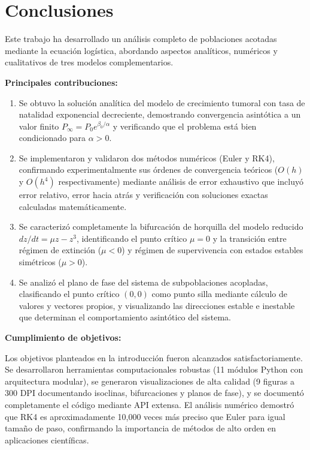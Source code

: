 \documentclass[a4paper,10pt,twocolumn]{article}
\begin{document}
\section{Conclusiones}\label{sec:conclusiones}

Este trabajo ha desarrollado un análisis completo de poblaciones acotadas mediante la ecuación logística, abordando aspectos analíticos, numéricos y cualitativos de tres modelos complementarios.

\textbf{Principales contribuciones:}

\begin{enumerate}
    \item Se obtuvo la solución analítica del modelo de crecimiento tumoral con tasa de natalidad exponencial decreciente, demostrando convergencia asintótica a un valor finito $P_{\infty} = P_0 e^{\beta_0/\alpha}$ y verificando que el problema está bien condicionado para $\alpha > 0$.

    \item Se implementaron y validaron dos métodos numéricos (Euler y RK4), confirmando experimentalmente sus órdenes de convergencia teóricos ($O(h)$ y $O(h^4)$ respectivamente) mediante análisis de error exhaustivo que incluyó error relativo, error hacia atrás y verificación con soluciones exactas calculadas matemáticamente.

    \item Se caracterizó completamente la bifurcación de horquilla del modelo reducido $dz/dt = \mu z - z^3$, identificando el punto crítico $\mu = 0$ y la transición entre régimen de extinción ($\mu < 0$) y régimen de supervivencia con estados estables simétricos ($\mu > 0$).

    \item Se analizó el plano de fase del sistema de subpoblaciones acopladas, clasificando el punto crítico $(0,0)$ como punto silla mediante cálculo de valores y vectores propios, y visualizando las direcciones estable e inestable que determinan el comportamiento asintótico del sistema.
\end{enumerate}

\textbf{Cumplimiento de objetivos:}

Los objetivos planteados en la introducción fueron alcanzados satisfactoriamente. Se desarrollaron herramientas computacionales robustas (11 módulos Python con arquitectura modular), se generaron visualizaciones de alta calidad (9 figuras a 300 DPI documentando isoclinas, bifurcaciones y planos de fase), y se documentó completamente el código mediante API extensa. El análisis numérico demostró que RK4 es aproximadamente 10,000 veces más preciso que Euler para igual tamaño de paso, confirmando la importancia de métodos de alto orden en aplicaciones científicas.
\end{document}
